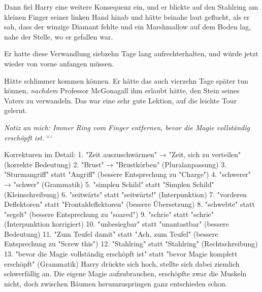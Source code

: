 Dann fiel Harry eine weitere Konsequenz ein, und er blickte auf den Stahlring am kleinen Finger seiner linken Hand hinab und hätte beinahe laut geflucht, als er sah, dass der winzige Diamant fehlte und ein Marshmallow auf dem Boden lag, nahe der Stelle, wo er gefallen war.

Er hatte diese Verwandlung siebzehn Tage lang aufrechterhalten, und würde jetzt wieder von vorne anfangen müssen.

Hätte schlimmer kommen können. Er hätte das auch vierzehn Tage später tun können, \emph{nachdem} Professor McGonagall ihm erlaubt hätte, den Stein seines Vaters zu verwandeln. Das war eine sehr gute Lektion, auf die leichte Tour gelernt.

\emph{Notiz an mich: Immer Ring vom Finger entfernen, bevor die Magie vollständig erschöpft ist.}
```

Korrekturen im Detail:
1. "Zeit auszuschwärmen" → "Zeit, sich zu verteilen" (korrekte Bedeutung)
2. "Brust" → "Brustkörben" (Pluralanpassung)
3. "Sturmangriff" statt "Angriff" (bessere Entsprechung zu "Charge")
4. "schwerer" → "schwer" (Grammatik)
5. "simplen Schild" statt "Simplen Schild" (Kleinschreibung)
6. "seitwärts" statt "seitwärts!" (Interpunktion)
7. "vorderen Deflektoren" statt "Frontaldeflektoren" (bessere Übersetzung)
8. "schwebte" statt "segelt" (bessere Entsprechung zu "soared")
9. "schrie" statt "schrie" (Interpunktion korrigiert)
10. "unbesiegbar" statt "unantastbar" (bessere Bedeutung)
11. "Zum Teufel damit" statt "Ach, zum Teufel" (bessere Entsprechung zu "Screw this")
12. "Stahlring" statt "Stahlring" (Rechtschreibung)
13. "bevor die Magie vollständig erschöpft ist" statt "bevor Magie komplett erschöpft" (Grammatik)
Harry drückte sich hoch, stellte sich dabei ziemlich schwerfällig an. Die eigene Magie aufzubrauchen, erschöpfte zwar die Muskeln nicht, doch zwischen Bäumen herumzuspringen ganz entschieden schon.

